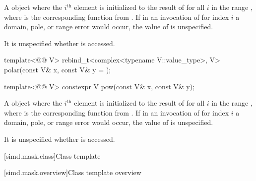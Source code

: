 \begin{itemdescr}
\pnum
\returns
A  object  where the $i^\text{th}$ element is
initialized to the result of  for all
$i$ in the range , where  is the
corresponding function from . If in an invocation of
 for index $i$ a domain, pole, or range error would
occur, the value of  is unspecified.

\pnum
\remarks
It is unspecified whether  is accessed.
\end{itemdescr}

\begin{itemdecl}
template<@@ V>
  rebind_t<complex<typename V::value_type>, V> polar(const V& x, const V& y = {});

template<@@ V> constexpr V pow(const V& x, const V& y);
\end{itemdecl}

\begin{itemdescr}
\pnum
\returns
A  object  where the $i^\text{th}$ element is
initialized to the result of 
for all $i$ in the range , where 
is the corresponding function from . If in an invocation of
 for index $i$ a domain, pole, or range error would
occur, the value of  is unspecified.

\pnum
\remarks
It is unspecified whether  is accessed.
\end{itemdescr}

[simd.mask.class]{Class template }

[simd.mask.overview]{Class template  overview}

